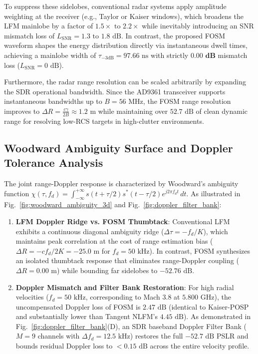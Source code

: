 \documentclass[journal,compsoc]{IEEEtran}
\begin{document}
To suppress these sidelobes, conventional radar systems apply amplitude weighting at the receiver (e.g., Taylor or Kaiser windows), which broadens the LFM mainlobe by a factor of $1.5\times\text{ to }2.2\times$ while inevitably introducing an SNR mismatch loss of $L_{\text{SNR}} = 1.3\text{ to }1.8\text{ dB}$. In contrast, the proposed FOSM waveform shapes the energy distribution directly via instantaneous dwell times, achieving a mainlobe width of $\tau_{-3\text{dB}} = 97.66\text{ ns}$ with strictly $\mathbf{0.00\text{ dB}}$ mismatch loss ($L_{\text{SNR}} = 0\text{ dB}$). 

Furthermore, the radar range resolution can be scaled arbitrarily by expanding the SDR operational bandwidth. Since the AD9361 transceiver supports instantaneous bandwidths up to $B = 56\text{ MHz}$, the FOSM range resolution improves to $\Delta R = \frac{c \gamma}{2B} \approx 1.2\text{ m}$ while maintaining over $52.7\text{ dB}$ of clean dynamic range for resolving low-RCS targets in high-clutter environments.

\subsection{Woodward Ambiguity Surface and Doppler Tolerance Analysis}
The joint range-Doppler response is characterized by Woodward's ambiguity function $\chi(\tau, f_d) = \int_{-\infty}^{+\infty} s(t + \tau/2) s^*(t - \tau/2) e^{j 2\pi f_d t} \, dt$. As illustrated in Fig.~\ref{fig:woodward_ambiguity_3d} and Fig.~\ref{fig:doppler_filter_bank}:
\begin{enumerate}
    \item \textbf{LFM Doppler Ridge vs. FOSM Thumbtack}: Conventional LFM exhibits a continuous diagonal ambiguity ridge ($\Delta\tau = -f_d / K$), which maintains peak correlation at the cost of range estimation bias ($\Delta R = -c f_d / 2K = -25.0\text{ m}$ for $f_d = 50\text{ kHz}$). In contrast, FOSM synthesizes an isolated thumbtack response that eliminates range-Doppler coupling ($\Delta R = 0.00\text{ m}$) while bounding far sidelobes to $-52.76\text{ dB}$.
    \item \textbf{Doppler Mismatch and Filter Bank Restoration}: For high radial velocities ($f_d = 50\text{ kHz}$, corresponding to Mach 3.8 at $5.800\text{ GHz}$), the uncompensated Doppler loss of FOSM is $2.47\text{ dB}$ (identical to Kaiser-POSP and substantially lower than Tangent NLFM's $4.45\text{ dB}$). As demonstrated in Fig.~\ref{fig:doppler_filter_bank}(D), an SDR baseband Doppler Filter Bank ($M=9$ channels with $\Delta f_d = 12.5\text{ kHz}$) restores the full $-52.7\text{ dB}$ PSLR and bounds residual Doppler loss to $<0.15\text{ dB}$ across the entire velocity profile.
\end{enumerate}
\end{document}
